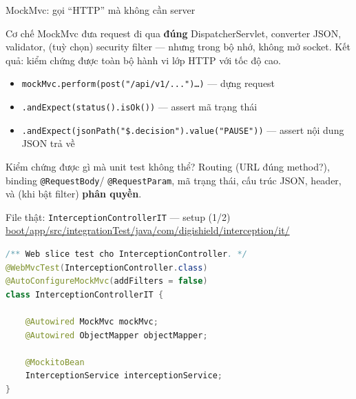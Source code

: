 \documentclass[aspectratio=169,12pt]{beamer}
\begin{document}
\begin{frame}{MockMvc: gọi ``HTTP'' mà không cần server}
  \begin{block}{Cơ chế}
    MockMvc đưa request đi qua \textbf{đúng} DispatcherServlet, converter JSON,
    validator, (tuỳ chọn) security filter --- nhưng trong bộ nhớ, không mở
    socket. Kết quả: kiểm chứng được toàn bộ hành vi lớp HTTP với tốc độ cao.
  \end{block}
  \begin{itemize}
    \item \texttt{mockMvc.perform(post("/api/v1/...")\ldots)} --- dựng request
    \item \texttt{.andExpect(status().isOk())} --- assert mã trạng thái
    \item \texttt{.andExpect(jsonPath("\$.decision").value("PAUSE"))} ---
      assert nội dung JSON trả về
  \end{itemize}
  \begin{exampleblock}{Kiểm chứng được gì mà unit test không thể?}
    Routing (URL đúng method?), binding \texttt{@RequestBody}/
    \texttt{@RequestParam}, mã trạng thái, cấu trúc JSON, header,
    và (khi bật filter) \textbf{phân quyền}.
  \end{exampleblock}
\end{frame}

\begin{frame}[fragile]{File thật: \texttt{InterceptionControllerIT} --- setup (1/2)}
  \small\url{boot/app/src/integrationTest/java/com/digishield/interception/it/}
\begin{lstlisting}[language=Java,style=code]
/** Web slice test cho InterceptionController. */
@WebMvcTest(InterceptionController.class)
@AutoConfigureMockMvc(addFilters = false)
class InterceptionControllerIT {

    @Autowired MockMvc mockMvc;
    @Autowired ObjectMapper objectMapper;

    @MockitoBean
    InterceptionService interceptionService;
}
\end{lstlisting}
\end{frame}
\end{document}
